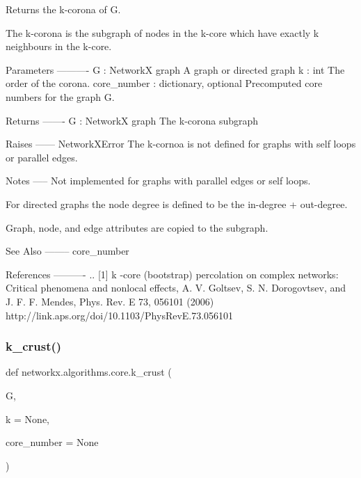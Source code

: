 \begin{DoxyVerb}Returns the k-corona of G.

The k-corona is the subgraph of nodes in the k-core which have
exactly k neighbours in the k-core.

Parameters
----------
G : NetworkX graph
   A graph or directed graph
k : int
   The order of the corona.
core_number : dictionary, optional
   Precomputed core numbers for the graph G.

Returns
-------
G : NetworkX graph
   The k-corona subgraph

Raises
------
NetworkXError
    The k-cornoa is not defined for graphs with self loops or
    parallel edges.

Notes
-----
Not implemented for graphs with parallel edges or self loops.

For directed graphs the node degree is defined to be the
in-degree + out-degree.

Graph, node, and edge attributes are copied to the subgraph.

See Also
--------
core_number

References
----------
.. [1]  k -core (bootstrap) percolation on complex networks:
   Critical phenomena and nonlocal effects,
   A. V. Goltsev, S. N. Dorogovtsev, and J. F. F. Mendes,
   Phys. Rev. E 73, 056101 (2006)
   http://link.aps.org/doi/10.1103/PhysRevE.73.056101
\end{DoxyVerb}
 \mbox{\label{namespacenetworkx_1_1algorithms_1_1core_a8a22ecae49cb847a57beb7b0b07e3bdd}} 
\subsubsection{\texorpdfstring{k\+\_\+crust()}{k\_crust()}}
{\footnotesize\ttfamily def networkx.\+algorithms.\+core.\+k\+\_\+crust (\begin{DoxyParamCaption}\item[{}]{G,  }\item[{}]{k = {\ttfamily None},  }\item[{}]{core\+\_\+number = {\ttfamily None} }\end{DoxyParamCaption})}

